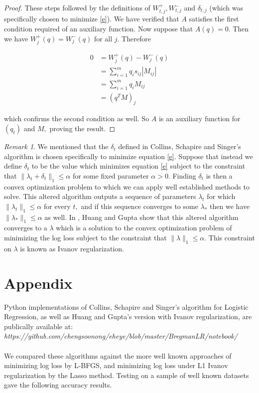 \documentclass[BSc]{usydthesis}
\numberwithin{equation}{chapter}
\theoremstyle{remark}
\newtheorem{Remark}[equation]{Remark}
\newcommand{\la}{\lambda}
\begin{document}
\begin{proof}
These steps followed by the definitions of $W^+_{t,j}, W^-_{t,j}$ and $\delta_{t,j}$ (which was specifically chosen to minimize \eqref{e}). We have verified that $A$ satisfies the first condition required of an auxiliary function. Now suppose that $A(q)=0.$ Then we have $W^+_j(q) = W^-_j(q)$ for all $j.$ Therefore 

\begin{align*}
 0 &= W^+_j(q) - W^-_j(q) \\
   &= \sum_{i=1}^m q_i s_{ij} |M_{ij}| \\
   &= \sum_{i=1}^m q_i M_{ij} \\
   &= (q^TM)_j
\end{align*}

which confirms the second condition as well. So $A$ is an auxiliary function for $(q_t)$ and $M,$ proving the result.

\end{proof}

\begin{Remark}
 We mentioned that the $\delta_t$ defined in Collins, Schapire and Singer's algorithm is chosen specifically to minimize equation \eqref{e}. Suppose that instead we define $\delta_t$ to be the value which minimizes equation \eqref{e} subject to the constraint that $\| \la_t + \delta_t \|_1 \leq \alpha$ for some fixed parameter $\alpha>0.$ Finding $\delta_t$ is then a convex optimization problem to which we can apply well established methods to solve. This altered algorithm outputs a sequence of parameters $\lambda_t$ for which $\| \lambda_t \|_1 \leq \alpha$ for every $t,$ and if this sequence converges to some $\lambda_*$ then we have $\| \lambda_* \|_1\leq \alpha$ as well. In \cite{Someone2000}, Huang and Gupta show that this altered algorithm converges to a $\lambda$ which is a solution to the convex optimization problem of minimizing the log loss subject to the constraint that $\| \lambda \|_1 \leq \alpha.$ This constraint on $\lambda$ is known as Ivanov regularization.
\end{Remark}



\chapter*{Appendix}
Python implementations of Collins, Schapire and Singer's algorithm for Logistic Regression, as well as Huang and Gupta's version with Ivanov regularization, are publically available at: \\
{\em https://github.com/chengsoonong/eheye/blob/master/BregmanLR/notebook/}\\
\\
We compared these algorithms against the more well known approaches of minimizing log loss by L-BFGS, and minimizing log loss under L1 Ivanov regularization by the Lasso method. Testing on a sample of well known datasets gave the following accuracy results.
\\
\end{document}
